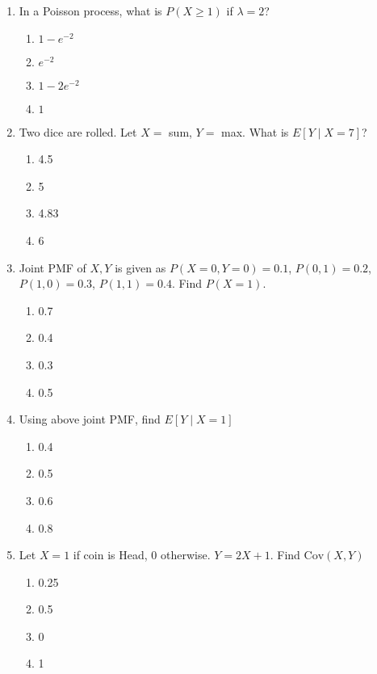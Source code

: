 \begin{enumerate}
\item In a Poisson process, what is \(P(X \geq 1)\) if \(\lambda = 2\)?

\begin{enumerate}[label=(\alph*)]
\item \(1 - e^{-2}\) \quad \item \(e^{-2}\) \quad \item \(1 - 2e^{-2}\) \quad \item \(1\)
\end{enumerate}

\item Two dice are rolled. Let \(X = \) sum, \(Y = \) max. What is \(E[Y \mid X=7]\)?

\begin{enumerate}[label=(\alph*)]
\item 4.5 \quad \item 5 \quad \item 4.83 \quad \item 6
\end{enumerate}

\newpage
\item Joint PMF of \(X, Y\) is given as \(P(X=0,Y=0)=0.1\), \(P(0,1)=0.2\), \(P(1,0)=0.3\), \(P(1,1)=0.4\). Find \(P(X=1)\).

\begin{enumerate}[label=(\alph*)]
\item 0.7 \quad \item 0.4 \quad \item 0.3 \quad \item 0.5
\end{enumerate}

\item Using above joint PMF, find \(E[Y \mid X = 1]\)

\begin{enumerate}[label=(\alph*)]
\item 0.4 \quad \item 0.5 \quad \item 0.6 \quad \item 0.8
\end{enumerate}

\item Let \(X = 1\) if coin is Head, \(0\) otherwise. \(Y = 2X + 1\). Find \(\text{Cov}(X, Y)\)

\begin{enumerate}[label=(\alph*)]
\item 0.25 \quad \item 0.5 \quad \item 0 \quad \item 1
\end{enumerate}


\end{enumerate}
